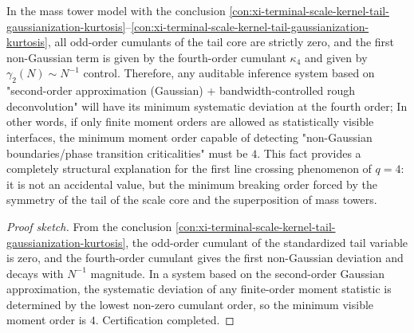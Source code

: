 \begin{conclusion}[\texorpdfstring{$(q=4)$}{(q=4)}'s regularization status: the fourth-order violation determines the minimum moment order of the visible phase transition]\label{con:xi-terminal-scale-kernel-q4-minimal-visible-order}
In the mass tower model with the conclusion \ref{con:xi-terminal-scale-kernel-tail-gaussianization-kurtosis}--\ref{con:xi-terminal-scale-kernel-tail-gaussianization-kurtosis}, all odd-order cumulants of the tail core are strictly zero, and the first non-Gaussian term is given by the fourth-order cumulant \(\kappa_4\) and given by
\(\gamma_2(N)\sim N^{-1}\)
control.
Therefore, any auditable inference system based on "second-order approximation (Gaussian) + bandwidth-controlled rough deconvolution" will have its minimum systematic deviation at the fourth order;
In other words, if only finite moment orders are allowed as statistically visible interfaces, the minimum moment order capable of detecting "non-Gaussian boundaries/phase transition criticalities" must be \(4\).
This fact provides a completely structural explanation for the first line crossing phenomenon of \(q=4\): it is not an accidental value, but the minimum breaking order forced by the symmetry of the tail of the scale core and the superposition of mass towers.
\end{conclusion}
\begin{proof}[Proof sketch]
From the conclusion \ref{con:xi-terminal-scale-kernel-tail-gaussianization-kurtosis}, the odd-order cumulant of the standardized tail variable is zero, and the fourth-order cumulant gives the first non-Gaussian deviation and decays with \(N^{-1}\) magnitude.
In a system based on the second-order Gaussian approximation, the systematic deviation of any finite-order moment statistic is determined by the lowest non-zero cumulant order, so the minimum visible moment order is \(4\). Certification completed.
\end{proof}



